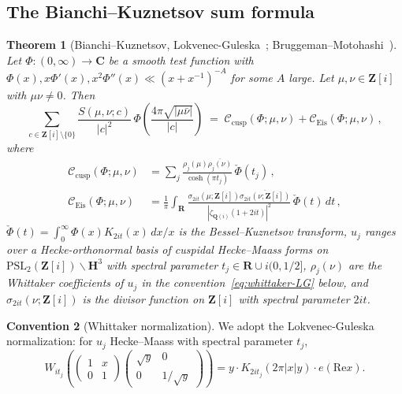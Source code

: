 \documentclass[11pt]{article}
\newtheorem{theorem}{Theorem}[section]
\theoremstyle{definition}
\newtheorem{convention}[theorem]{Convention}
\newcommand{\Z}{\mathbf{Z}}
\newcommand{\Q}{\mathbf{Q}}
\newcommand{\R}{\mathbf{R}}
\newcommand{\C}{\mathbf{C}}
\newcommand{\HH}{\mathbf{H}}
\newcommand{\Zi}{\Z[i]}
\newcommand{\Qi}{\Q(i)}
\renewcommand{\Re}{\mathrm{Re}}
\begin{document}
\subsection{The Bianchi--Kuznetsov sum formula}\label{ssec:bianchi-kuznetsov}

\begin{theorem}[Bianchi--Kuznetsov, Lokvenec-Guleska~\cite{LG}; Bruggeman--Motohashi~\cite{BM}]\label{thm:BK}
Let $\Phi:(0,\infty)\to\C$ be a smooth test function with $\Phi(x),x\Phi'(x),x^2\Phi''(x)\ll(x+x^{-1})^{-A}$ for some $A$ large. Let $\mu,\nu\in\Zi$ with $\mu\nu\ne 0$. Then
\[
   \sum_{c\in\Zi\setminus\{0\}}\frac{S(\mu,\nu;c)}{|c|^2}\,\Phi\!\left(\frac{4\pi\sqrt{|\mu\bar\nu|}}{|c|}\right)\;=\;\mathcal C_{\text{cusp}}(\Phi;\mu,\nu)+\mathcal C_{\text{Eis}}(\Phi;\mu,\nu)\,,
\]
where
\begin{align*}
   \mathcal C_{\text{cusp}}(\Phi;\mu,\nu)&=\sum_j\frac{\rho_j(\mu)\overline{\rho_j(\nu)}}{\cosh(\pi t_j)}\,\check\Phi(t_j)\,,\\
   \mathcal C_{\text{Eis}}(\Phi;\mu,\nu)&=\frac{1}{\pi}\int_\R\frac{\sigma_{2it}(\mu;\Zi)\overline{\sigma_{2it}(\nu;\Zi)}}{|\zeta_{\Qi}(1+2it)|^2}\,\check\Phi(t)\,dt\,,
\end{align*}
$\check\Phi(t)=\int_0^\infty\Phi(x)K_{2it}(x)\,dx/x$ is the Bessel--Kuznetsov transform, $u_j$ ranges over a Hecke-orthonormal basis of cuspidal Hecke--Maass forms on $\mathrm{PSL}_2(\Zi)\backslash\HH^3$ with spectral parameter $t_j\in\R\cup i(0,1/2]$, $\rho_j(\nu)$ are the Whittaker coefficients of $u_j$ in the convention~\eqref{eq:whittaker-LG} below, and $\sigma_{2it}(\nu;\Zi)$ is the divisor function on $\Zi$ with spectral parameter $2it$.
\end{theorem}

\begin{convention}[Whittaker normalization]\label{conv:whittaker}
We adopt the Lokvenec-Guleska normalization: for $u_j$ Hecke--Maass with spectral parameter $t_j$,
\begin{equation}\label{eq:whittaker-LG}
   W_{it_j}\!\left(\begin{pmatrix}1&x\\0&1\end{pmatrix}\begin{pmatrix}\sqrt y&0\\0&1/\sqrt y\end{pmatrix}\right)=y\cdot K_{2it_j}(2\pi|x|y)\cdot e(\Re x).
\end{equation}
\end{convention}
\end{document}
